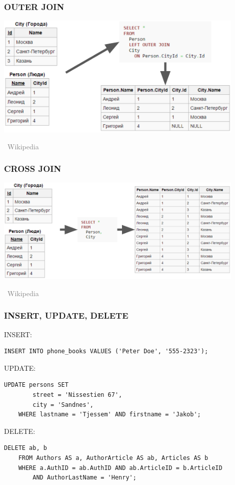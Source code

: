 \documentclass[xetex,mathserif,serif]{beamer}
\newcommand{\attribution}[1] {
\vspace{-5mm}\begin{flushright}\begin{scriptsize}\textcolor{gray}{\textcopyright\, #1}\end{scriptsize}\end{flushright}
}
\begin{document}
    \begin{frame}
        \frametitle{OUTER JOIN}
        \begin{center}
            \includegraphics[width=0.9\textwidth]{outerJoin.png}
            \attribution{Wikipedia}
        \end{center}
    \end{frame}

    \begin{frame}
        \frametitle{CROSS JOIN}
        \begin{center}
            \includegraphics[width=0.9\textwidth]{crossJoin.png}
            \attribution{Wikipedia}
        \end{center}
    \end{frame}

    \begin{frame}[fragile]
        \frametitle{INSERT, UPDATE, DELETE}
        \begin{small}
            INSERT:
            \begin{verbatim}
INSERT INTO phone_books VALUES ('Peter Doe', '555-2323');
            \end{verbatim}

            \vspace{3mm}
            UPDATE:
            \begin{verbatim}
UPDATE persons SET
        street = 'Nissestien 67',
        city = 'Sandnes',
    WHERE lastname = 'Tjessem' AND firstname = 'Jakob';
            \end{verbatim}

            \vspace{3mm}
            DELETE:
            \begin{verbatim}
DELETE ab, b
    FROM Authors AS a, AuthorArticle AS ab, Articles AS b
    WHERE a.AuthID = ab.AuthID AND ab.ArticleID = b.ArticleID
        AND AuthorLastName = 'Henry';
            \end{verbatim}
        \end{small}
    \end{frame}
\end{document}
